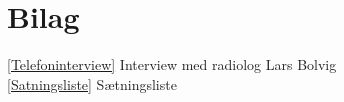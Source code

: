 \chapter{Bilag}\label{Bilag}

\ref{Telefoninterview} Interview med radiolog Lars Bolvig\\
\ref{Satningsliste} Sætningsliste

